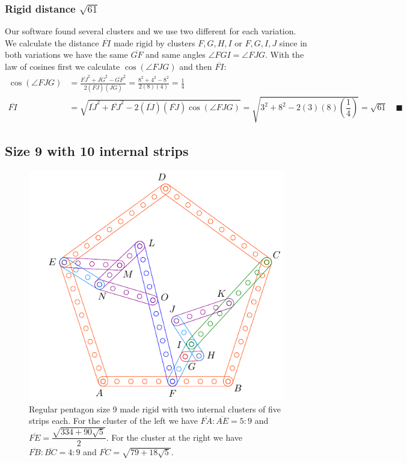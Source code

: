 \documentclass[11pt]{article}
\begin{document}
\subsubsection{Rigid distance $\sqrt{61}$}

Our software found several clusters and we use two different for each variation. We  calculate the distance $\overline{FI}$ made rigid by clusters $F,G,H,I$ or $F,G,I,J$ since in both variations we have the same $\overline{GF}$ and same angles $\angle{FGI}=\angle{FJG}$. With the law of cosines first we calculate $\cos(\angle{FJG})$ and then $\overline{FI}$:
\begin{align}
\cos(\angle{FJG}) &= \frac{\overline{FJ}^2 + \overline{JG}^2 - \overline{GF}^2}
 {2(\overline{FJ})(\overline{JG})}
 = \frac{8^2 + 4^2 - 8^2}{2(8)(4)} = \frac{1}4\nonumber\\
\overline{FI} &= \sqrt{\overline{IJ}^2 + \overline{FJ}^2 
 - 2(\overline{IJ})(\overline{FJ})\cos(\angle{FJG})}
 = \sqrt{3^2 + 8^2 - 2(3)(8)\left(\dfrac{1}4\right)} = \sqrt{61} \quad\blacksquare
\end{align}

\subsection{Size 9 with 10 internal strips}

\begin{figure}[H]
 \centering
 \includegraphics[scale=0.9]{9/penta9b}
 \caption{Regular pentagon size 9 made rigid with two internal clusters of five strips each. For the cluster of the left we have $\overline{FA}:\overline{AE} = 5:9$ and $\overline{FE} = \dfrac{\sqrt{334 + 90\sqrt5}}2$. For the cluster at the right we have $\overline{FB}:\overline{BC} = 4:9$ and $\overline{FC}=\sqrt{79 + 18\sqrt5}$.}
 \label{fig:penta9b}
\end{figure}
\end{document}
